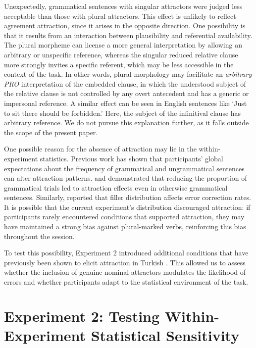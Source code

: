 \documentclass[
  authoryear,
  3p]{elsarticle}
\begin{document}
Unexpectedly, grammatical sentences with singular attractors were judged
less acceptable than those with plural attractors. This effect is
unlikely to reflect agreement attraction, since it arises in the
opposite direction. One possibility is that it results from an
interaction between plausibility and referential availability. The
plural morpheme can license a more general interpretation by allowing an
arbitrary or unspecific reference, whereas the singular reduced relative
clause more strongly invites a specific referent, which may be less
accessible in the context of the task. In other words, plural morphology
may facilitate an \emph{arbitrary PRO} interpretation of the embedded
clause, in which the understood subject of the relative clause is not
controlled by any overt antecedent and has a generic or impersonal
reference. A similar effect can be seen in English sentences like `Just
to sit there should be forbidden.' Here, the subject of the infinitival
clause has arbitrary reference. We do not pursue this explanation
further, as it falls outside the scope of the present paper.

One possible reason for the absence of attraction may lie in the
within-experiment statistics. Previous work has shown that participants'
global expectations about the frequency of grammatical and ungrammatical
sentences can alter attraction patterns. \citet{HammerlyEtAl2019} and
\citet{Turk2022} demonstrated that reducing the proportion of
grammatical trials led to attraction effects even in otherwise
grammatical sentences. Similarly, \citet{ArehalliWittenberg2021}
reported that filler distribution affects error correction rates. It is
possible that the current experiment's distribution discouraged
attraction: if participants rarely encountered conditions that supported
attraction, they may have maintained a strong bias against plural-marked
verbs, reinforcing this bias throughout the session.

To test this possibility, Experiment 2 introduced additional conditions
that have previously been shown to elicit attraction in Turkish
\citep{TurkLogacev2024, LagoEtAl2019}. This allowed us to assess whether
the inclusion of genuine nominal attractors modulates the likelihood of
errors and whether participants adapt to the statistical environment of
the task.

\section{Experiment 2: Testing Within-Experiment Statistical
Sensitivity}\label{experiment-2-testing-within-experiment-statistical-sensitivity}
\end{document}
